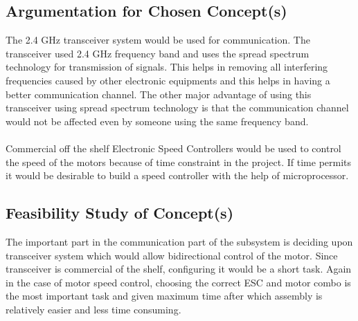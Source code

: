 \subsection{Argumentation for Chosen Concept(s)}

The 2.4 GHz transceiver system would be used for communication. The transceiver used 2.4 GHz frequency band and uses the spread spectrum technology for transmission of signals. This helps in removing all interfering frequencies caused by other electronic equipments and this helps in having a better communication channel. The other major advantage of using this transceiver using spread spectrum technology is that the communication channel would not be affected even by someone using the same frequency band.
\\
\\
Commercial off the shelf Electronic Speed Controllers would be used to control the speed of the motors because of time constraint in the project. If time permits it would be desirable to build a speed controller with the help of microprocessor.

\subsection{Feasibility Study of Concept(s)}

The important part in the communication part of the subsystem is deciding upon transceiver system which would allow bidirectional control of the motor. Since transceiver is commercial of the shelf, configuring it would be a short task.
Again in the case of motor speed control, choosing the correct ESC and motor combo is the most important task and given maximum time after which assembly is relatively easier and less time consuming.

%
%
%

